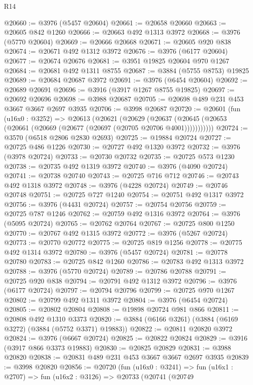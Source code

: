 \begin{lexlean}{R14}
\begin{coremodule}
@20660 := @3976 (@5457 @20604)
@20661 := @20658 @20660
@20663 := @20605 @842 @1260
@20666 := @20663 @492 @1313 @3972
@20668 := @3976 (@5770 @20604)
@20669 := @20666 @20668
@20671 := @20605 @920 @838
@20674 := @20671 @492 @1312 @3972
@20676 := @3976 (@6177 @20604)
@20677 := @20674 @20676
@20681 := @3951 @19825 @20604 @970 @1267
@20684 := @20681 @492 @1311 @8755
@20687 := @3884 (@5755 @8753) @19825
@20689 := @20684 @20687 @3972
@20691 := @3976 (@6454 @20604)
@20692 := @20689 @20691
@20696 := @3916 (@3917 @1267 @8755 @19825)
@20697 := @20692 @20696
@20698 := @3988 @20687
@20705 := @20698 @489 @231 @453 @3667 @3667 @2697 @3935
@20706 := @3998 @20687
@20720 := @20601
    (fun (u16x0 : @3252) =>
    @20613
      (@20621
        (@20629
          (@20637 (@20645 (@20653 (@20661 (@20669 (@20677 (@20697 (@20705 @20706 @4001)))))))))))
@20724 := @3570 (@6518 @2806 @2830 @2693)
@20725 := @19884 @20724
@20727 := @20725 @486 @1226
@20730 := @20727 @492 @1320 @3972
@20732 := @3976 (@3978 @20724)
@20733 := @20730 @20732
@20735 := @20725 @573 @1230
@20738 := @20735 @492 @1319 @3972
@20740 := @3976 (@4090 @20724)
@20741 := @20738 @20740
@20743 := @20725 @716 @712
@20746 := @20743 @492 @1318 @3972
@20748 := @3976 (@4228 @20724)
@20749 := @20746 @20748
@20751 := @20725 @727 @1240
@20754 := @20751 @492 @1317 @3972
@20756 := @3976 (@4431 @20724)
@20757 := @20754 @20756
@20759 := @20725 @787 @1246
@20762 := @20759 @492 @1316 @3972
@20764 := @3976 (@5095 @20724)
@20765 := @20762 @20764
@20767 := @20725 @800 @1250
@20770 := @20767 @492 @1315 @3972
@20772 := @3976 (@5267 @20724)
@20773 := @20770 @20772
@20775 := @20725 @819 @1256
@20778 := @20775 @492 @1314 @3972
@20780 := @3976 (@5457 @20724)
@20781 := @20778 @20780
@20783 := @20725 @842 @1260
@20786 := @20783 @492 @1313 @3972
@20788 := @3976 (@5770 @20724)
@20789 := @20786 @20788
@20791 := @20725 @920 @838
@20794 := @20791 @492 @1312 @3972
@20796 := @3976 (@6177 @20724)
@20797 := @20794 @20796
@20799 := @20725 @970 @1267
@20802 := @20799 @492 @1311 @3972
@20804 := @3976 (@6454 @20724)
@20805 := @20802 @20804
@20808 := @19898 @20724 @981 @866
@20811 := @20808 @492 @1310 @3373
@20820 := @3884 (@6166 @3261) (@3884 (@6169 @3272) (@3884 (@5752 @3371) @19883))
@20822 := @20811 @20820 @3972
@20824 := @3976 (@6667 @20724)
@20825 := @20822 @20824
@20829 := @3916 (@3917 @866 @3373 @19883)
@20830 := @20825 @20829
@20831 := @3988 @20820
@20838 := @20831 @489 @231 @453 @3667 @3667 @2697 @3935
@20839 := @3998 @20820
@20856 := @20720
    (fun (u16x0 : @3241) =>
    fun (u16x1 : @2707) =>
    fun (u16x2 : @3126) =>
    @20733
      (@20741
        (@20749

\end{coremodule}
\end{lexlean}
